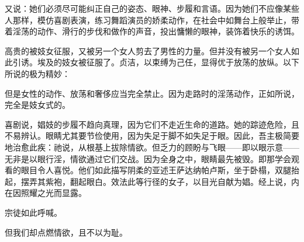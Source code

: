 又说：她们必须尽可能纠正自己的姿态、眼神、步履和言语。因为她们不应像某些人那样，模仿喜剧表演，练习舞蹈演员的娇柔动作，在社会中如舞台上般举止，带着淫荡的动作、滑行的步伐和做作的声音，投出慵懒的眼神，装饰着快乐的诱饵。\par

高贵的被妓女征服，又被另一个女人剪去了男性的力量。但并没有被另一个女人如此引诱。埃及的妓女被征服了。贞洁，以束缚为己任，显得优于放荡的放纵。以下所说的极为精妙：\par

\par

但是女性的动作、放荡和奢侈应当完全禁止。因为走路时的淫荡动作，正如所说，完全是妓女式的。\par

喜剧说，娼妓的步履不趋向真理，因为它们不走近生命的道路。她的踪迹危险，且不易辨认。眼睛尤其要节俭使用，因为失足于脚不如失足于眼。因此，吾主极简要地治愈此疾：祂说，从根基上拔除情欲。但乏力的顾盼与飞眼——即以眼示意——无非是以眼行淫，情欲通过它们交战。因为全身之中，眼睛最先被毁。即那学会观看的眼目令人喜悦。他们如此描写阴柔的亚述王萨达纳帕卢斯，坐于卧榻，双腿抬起，摆弄其紫袍，翻起眼白。效法此等行径的女子，以目光自献为娼。经上说，内在因照耀之光而显露。\par

宗徒如此呼喊。\par

但我们却点燃情欲，且不以为耻。\par


